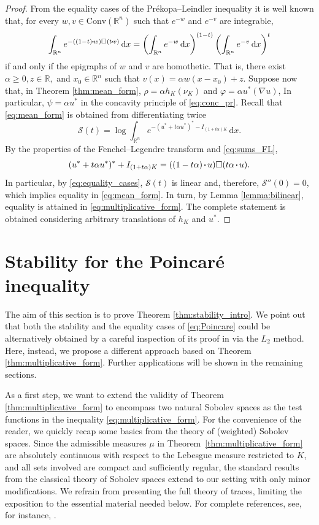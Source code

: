 \documentclass[a4paper, 11pt]{article}
\newcommand{\R}{\mathbb{R}}
\theoremstyle{definition}
\newcommand*\sq{\mathbin{\vcenter{\hbox{\rule{.3ex}{.3ex}}}}}
\newcommand{\Conv}{\mathrm{Conv}}
\newcommand{\di}{\, \mathrm{d}}
\newcommand{\F}{\mathcal{S}}
\begin{document}
\begin{proof}
    From the equality cases of the Pr\'ekopa--Leindler inequality it is well known that, for every $w, v \in \Conv(\R^n)$ such that $e^{-w}$ and $e^{-v}$ are integrable,
    \begin{equation}\label{eq:equality_cases}
        \int_{\R^n} e^{-((1-t)\sq w) \square (t\sq v)} \di x = \left( \int_{\R^n} e^{-w} \di x\right)^{(1-t)}\left( \int_{\R^n} e^{-v} \di x\right)^t
    \end{equation}
    if and only if the epigraphs of $w$ and $v$ are homothetic. That is, there exist $\alpha \geq 0, z \in \R,$ and $x_0 \in \R^n$ such that $v(x)=\alpha w(x-x_0)+z$. 
    Suppose now that, in Theorem \ref{thm:mean_form}, $\rho=\alpha h_K(\nu_K)$ and $\varphi=\alpha u^*(\nabla u)$, In particular, $\psi=\alpha u^*$ in the concavity principle of \eqref{eq:conc_pr}. Recall that \eqref{eq:mean_form} is obtained from differentiating twice \[ \F(t)=\log \int_{\R^n}e^{-(u^*+t\alpha u^*)^*-I_{(1+t\alpha)K}}\di x.\] By the properties of the Fenchel--Legendre transform and \eqref{eq:sums_FL}, \[ (u^*+t\alpha u^*)^*+I_{(1+t\alpha)K}=((1-t\alpha)\sq u)\square (t\alpha \sq u).\]In particular, by \eqref{eq:equality_cases}, $\F(t)$ is linear and, therefore, $\F''(0)=0$, which implies equality in \eqref{eq:mean_form}. In turn, by Lemma \ref{lemma:bilinear}, equality is attained in \eqref{eq:multiplicative_form}. The complete statement is obtained considering arbitrary translations of $h_K$ and $u^*$. 
\end{proof}


\section{Stability for the Poincar\'e inequality}

The aim of this section is to prove Theorem \ref{thm:stability_intro}. We point out that both the stability and the equality cases of \eqref{eq:Poincare} could be alternatively obtained by a careful inspection of its proof in \cite{Kol_Mil_P} via the $L_2$ method. Here, instead, we propose a different approach based on Theorem \ref{thm:multiplicative_form}. Further applications will be shown in the remaining sections.

\medskip

As a first step, we want to extend the validity of Theorem \ref{thm:multiplicative_form} to encompass two natural Sobolev spaces as the test functions in the inequality \eqref{eq:multiplicative_form}. For the convenience of the reader, we quickly recap some basics from the theory of (weighted) Sobolev spaces. Since the admissible measures $\mu$ in Theorem~\ref{thm:multiplicative_form} are absolutely continuous with respect to the Lebesgue measure restricted to $K$, and all sets involved are compact and sufficiently regular, the standard results from the classical theory of Sobolev spaces extend to our setting with only minor modifications. We refrain from presenting the full theory of traces, limiting the exposition to the essential material needed below. For complete references, see, for instance, \cite{SobBook,BrezisBook,LeoniBook}.
\end{document}
